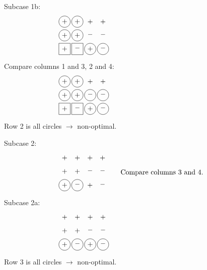 Subcase 1b:
\begin{equation*}
\myarrset
\begin{array}{cccc}
\dcp  & \dcp  & \ndcp & \ndcp \\
\dcp  & \dcp  & \ndcm & \ndcm \\
\dsp  & \dsm  & \dcp  & \dcm
\end{array}
~~~~~~~~~~~~~~~~~~~~~~~~~~~~~~~~~~~~~~~~
\end{equation*}
Compare columns 1 and 3, 2 and 4:
\begin{equation*}
\myarrset
\begin{array}{cccc}
\dcp  & \dcp  & \ndcp & \ndcp \\
\dcp  & \dcp  & \dcm  & \dcm  \\
\dsp  & \dsm  & \dcp  & \dcm
\end{array}
~~~~~~~~~~~~~~~~~~~~~~~~~~~~~~~~~~~~~~~~
\end{equation*}
Row 2 is all circles $\rightarrow$ non-optimal.

Subcase 2:
\begin{equation*}
\myarrset
\begin{array}{cccc}
\ndcp & \ndcp & \ndcp & \ndcp \\
\ndcp & \ndcp & \ndcm & \ndcm \\
\dcp  & \dcm  & \ndcp & \ndcm
\end{array}
~~~~~\text{Compare columns 3 and 4.}
\end{equation*}
Subcase 2a:
\begin{equation*}
\myarrset
\begin{array}{cccc}
\ndcp & \ndcp & \ndcp & \ndcp \\
\ndcp & \ndcp & \ndcm & \ndcm \\
\dcp  & \dcm  & \dcp  & \dcm
\end{array}
~~~~~~~~~~~~~~~~~~~~~~~~~~~~~~~~~~~~~~~~
\end{equation*}
Row 3 is all circles $\rightarrow$ non-optimal.

